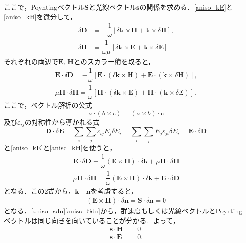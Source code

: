 ここで，Poyntingベクトル$\boldsymbol{S}$と光線ベクトル$\boldsymbol{s}$の関係を求める．\eqref{aniso_kE}と\eqref{aniso_kH}を微分して，
\begin{align*}
  \delta\boldsymbol{D} &= -\dfrac{1}{\omega}[\delta\boldsymbol{k}\times\boldsymbol{H}+\boldsymbol{k}\times\delta\boldsymbol{H}] , \\
  \delta\boldsymbol{H} &= \dfrac{1}{\omega\mu}[\delta\boldsymbol{k}\times\boldsymbol{E}+\boldsymbol{k}\times\delta\boldsymbol{E}] .
\end{align*}
それぞれの両辺で$\boldsymbol{E}$, $\boldsymbol{H}$とのスカラー積を取ると，
\begin{align*}
  \boldsymbol{E}\cdot\delta\boldsymbol{D} = -\dfrac{1}{\omega}[\boldsymbol{E}\cdot(\delta\boldsymbol{k}\times\boldsymbol{H})+\boldsymbol{E}\cdot(\boldsymbol{k}\times\delta\boldsymbol{H})] , \\
  \mu\boldsymbol{H}\cdot\delta\boldsymbol{H} = \dfrac{1}{\omega}[\boldsymbol{H}\cdot(\delta\boldsymbol{k}\times\boldsymbol{E})+\boldsymbol{H}\cdot(\boldsymbol{k}\times\delta\boldsymbol{E})] .
\end{align*}
ここで，ベクトル解析の公式
\[a\cdot(b\times{}c)=(a\times{}b)\cdot{}c\]
及び$\varepsilon_{ij}$の対称性から導かれる式
\[\boldsymbol{D}\cdot\delta\boldsymbol{E}=\sum_i\sum_j\varepsilon_{ij}E_j\delta{}E_i=\sum_i\sum_jE_j\varepsilon_{ji}\delta{}E_i=\boldsymbol{E}\cdot\delta\boldsymbol{D}\]
と\eqref{aniso_kE}と\eqref{aniso_kH}を使うと，
\begin{align*}
  \boldsymbol{E}\cdot\delta\boldsymbol{D} = \dfrac{1}{\omega}(\boldsymbol{E}\times\boldsymbol{H})\cdot\delta\boldsymbol{k}+\mu\boldsymbol{H}\cdot\delta\boldsymbol{H}\\
  \mu\boldsymbol{H}\cdot\delta\boldsymbol{H} = \dfrac{1}{\omega}(\boldsymbol{E}\times\boldsymbol{H})\cdot\delta\boldsymbol{k}+ \boldsymbol{E}\cdot\delta\boldsymbol{D}
\end{align*}
となる．この2式から，$\boldsymbol{k}\parallel\boldsymbol{n}$を考慮すると，
\begin{align}
  (\boldsymbol{E}\times\boldsymbol{H})\cdot\delta\boldsymbol{n}=\boldsymbol{S}\cdot\delta\boldsymbol{n}=0\label{aniso_Sdn}
\end{align}
となる．\eqref{aniso_sdn}\eqref{aniso_Sdn}から，群速度もしくは光線ベクトルとPoyntingベクトルは同じ向きを向いていることが分かる．よって，
\begin{align}
  \boldsymbol{s}\cdot\boldsymbol{H} &= 0\label{aniso_sE}\\
  \boldsymbol{s}\cdot\boldsymbol{E} &= 0.\label{aniso_sH}
\end{align}

